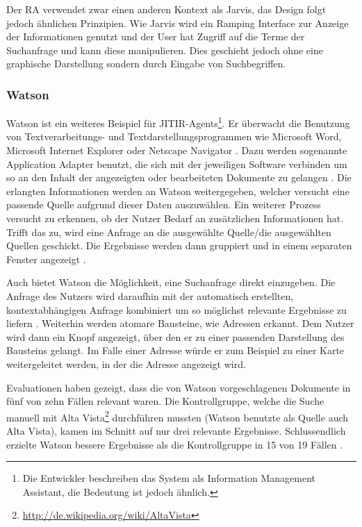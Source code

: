  	Der RA verwendet zwar einen anderen Kontext als Jarvis, das Design folgt jedoch ähnlichen Prinzipien. Wie Jarvis wird ein Ramping Interface zur Anzeige der Informationen genutzt und der User hat Zugriff auf die Terme der Suchanfrage und kann diese manipulieren. Dies geschieht jedoch ohne eine graphische Darstellung sondern durch Eingabe von Suchbegriffen.

 	\subsubsection{Watson}
 	Watson ist ein weiteres Beispiel für JITIR-Agents\footnote{Die Entwickler beschreiben das System als Information Management Assistant, die Bedeutung ist jedoch ähnlich.}. Er überwacht die Benutzung von Textverarbeitungs- und Textdarstellungsprogrammen wie Microsoft Word, Microsoft Internet Explorer oder Netscape Navigator \cite{budzik1999watson}. Dazu werden sogenannte Application Adapter benutzt, die sich mit der jeweiligen Software verbinden um so an den Inhalt der angezeigten oder bearbeiteten Dokumente zu gelangen \cite{budzik2000user}. Die erlangten Informationen werden an Watson weitergegeben, welcher versucht eine passende Quelle aufgrund dieser Daten auszuwählen. Ein weiterer Prozess versucht zu erkennen, ob der Nutzer Bedarf an zusätzlichen Informationen hat. Trifft das zu, wird eine Anfrage an die ausgewählte Quelle/die ausgewählten Quellen geschickt. Die Ergebnisse werden dann gruppiert und in einem separaten Fenster angezeigt \cite{budzik1999watson}.

 	Auch bietet Watson die Möglichkeit, eine Suchanfrage direkt einzugeben. Die Anfrage des Nutzers wird daraufhin mit der automatisch erstellten, kontextabhängigen Anfrage kombiniert um so möglichst relevante Ergebnisse zu liefern \cite{budzik2000user}. Weiterhin werden atomare Bausteine, wie Adressen erkannt. Dem Nutzer wird dann ein Knopf angezeigt, über den er zu einer passenden Darstellung des Bausteins gelangt. Im Falle einer Adresse würde er zum Beispiel zu einer Karte weitergeleitet werden, in der die Adresse angezeigt wird.

 	Evaluationen haben gezeigt, dass die von Watson vorgeschlagenen Dokumente in fünf von zehn Fällen relevant waren. Die Kontrollgruppe, welche die Suche manuell mit Alta Vista\footnote{\url{http://de.wikipedia.org/wiki/AltaVista}} durchführen mussten (Watson benutzte als Quelle auch Alta Vista), kamen im Schnitt auf nur drei relevante Ergebnisse. Schlussendlich erzielte Watson bessere Ergebnisse als die Kontrollgruppe in 15 von 19 Fällen \cite{budzik1999watson}.

